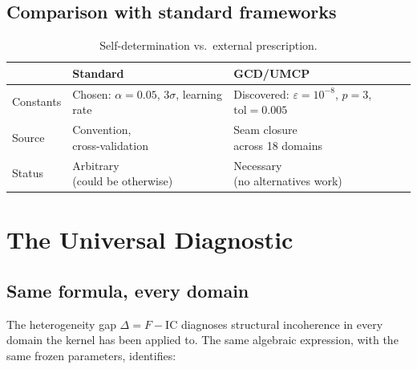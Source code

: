 \documentclass[
  aps,
  prd,
  twocolumn,
  superscriptaddress,
  nofootinbib,
  floatfix
]{revtex4-2}
\newcommand{\eps}{\varepsilon}
\newcommand{\IC}{\mathrm{IC}}
\begin{document}
\subsection{Comparison with standard frameworks}

\begin{table}[t]
\caption{\label{tab:self-determination}Self-determination
vs.\ external prescription.}
\begin{ruledtabular}
\begin{tabular}{lll}
 & Standard & GCD/UMCP \\
\midrule
Constants &
  \parbox[t]{2.4cm}{Chosen: $\alpha{=}0.05$,\\$3\sigma$, learning rate} &
  \parbox[t]{2.4cm}{Discovered:\\$\eps{=}10^{-8}$, $p{=}3$,\\$\mathrm{tol}{=}0.005$} \\[10pt]
Source &
  \parbox[t]{2.4cm}{Convention,\\cross-validation} &
  \parbox[t]{2.4cm}{Seam closure\\across 18 domains} \\[8pt]
Status &
  \parbox[t]{2.4cm}{Arbitrary\\(could be otherwise)} &
  \parbox[t]{2.4cm}{Necessary\\(no alternatives work)}
\end{tabular}
\end{ruledtabular}
\end{table}

\section{The Universal Diagnostic}\label{sec:universal-diagnostic}

\subsection{Same formula, every domain}

The heterogeneity gap $\Delta = F - \IC$ diagnoses structural
incoherence in every domain the kernel has been applied to.  The
same algebraic expression, with the same frozen parameters, identifies:
\end{document}
